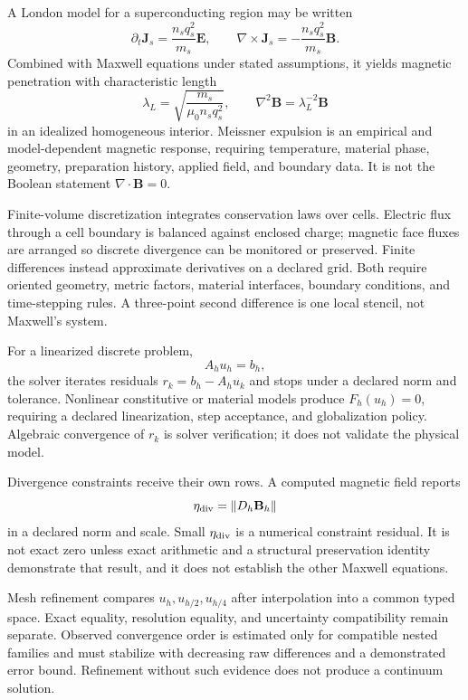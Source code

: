 A London model for a superconducting region may be written
\[
\partial_t\mathbf J_s=\frac{n_sq_s^2}{m_s}\mathbf E,\qquad
\nabla\times\mathbf J_s=-\frac{n_sq_s^2}{m_s}\mathbf B.
\]
Combined with Maxwell equations under stated assumptions, it yields magnetic penetration with characteristic length
\[
                         \lambda_L=\sqrt{\frac{m_s}{\mu_0n_sq_s^2}},
\qquad
\nabla^2\mathbf B=\lambda_L^{-2}\mathbf B
\]
in an idealized homogeneous interior.  Meissner expulsion is an empirical and model-dependent magnetic response,
requiring temperature, material phase, geometry, preparation history, applied field, and boundary data.  It is not
the Boolean statement \(\nabla\cdot\mathbf B=0\).

Finite-volume discretization integrates conservation laws over cells.  Electric flux through a cell boundary is
balanced against enclosed charge; magnetic face fluxes are arranged so discrete divergence can be monitored or
preserved.  Finite differences instead approximate derivatives on a declared grid.  Both require oriented geometry,
metric factors, material interfaces, boundary conditions, and time-stepping rules.  A three-point second difference
is one local stencil, not Maxwell's system.

For a linearized discrete problem,
\[
                         A_hu_h=b_h,
\]
the solver iterates residuals \(r_k=b_h-A_hu_k\) and stops under a declared norm and tolerance.  Nonlinear constitutive
or material models produce \(F_h(u_h)=0\), requiring a declared linearization, step acceptance, and globalization
policy.  Algebraic convergence of \(r_k\) is solver verification; it does not validate the physical model.

Divergence constraints receive their own rows.  A computed magnetic field reports
\[
                         \eta_{\rm div}=\|D_h\mathbf B_h\|
\]
in a declared norm and scale.  Small \(\eta_{\rm div}\) is a numerical constraint residual.  It is not exact zero
unless exact arithmetic and a structural preservation identity demonstrate that result, and it does not establish
the other Maxwell equations.

Mesh refinement compares \(u_h,u_{h/2},u_{h/4}\) after interpolation into a common typed space.  Exact equality,
resolution equality, and uncertainty compatibility remain separate.  Observed convergence order is estimated only
for compatible nested families and must stabilize with decreasing raw differences and a demonstrated error bound.
Refinement without such evidence does not produce a continuum solution.

